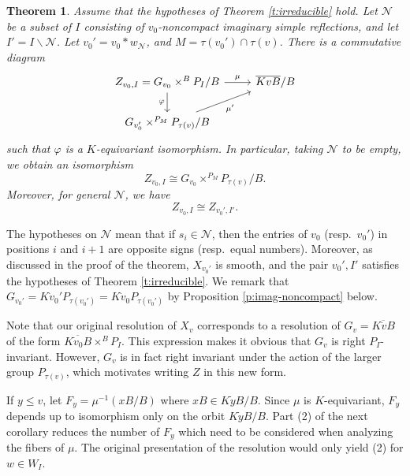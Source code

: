 \documentclass[11pt,letterpaper,reqno]{amsart}
\newcommand{\cN}{\mathcal N}
\numberwithin{equation}{section}
\theoremstyle{plain}
\newtheorem{theorem}{Theorem}[section]
\theoremstyle{definition}
\theoremstyle{remark}
\begin{document}
\begin{theorem}\label{t:symmetric-mu}
Assume that the hypotheses of Theorem \ref{t:irreducible}  hold.
Let $\cN$ be a subset of $I$ consisting of $v_0$-noncompact imaginary simple reflections, and
let $I' = I \smallsetminus \cN$.  
Let $v_0' = v_0 * w_{\cN}$, and \(M= \tau(v_0') \cap\tau(v)\).
There is a commutative diagram
\begin{equation}\label{e:symmetric-mu}
\begin{tikzcd}
Z_{v_0, I} = G_{v_0} \times^B P_I/B\arrow[r,"\mu"]\arrow[d,swap,"\varphi"]&\overline{KvB}/B\\
G_{v_0'} \times^{P_M} P_{\tau(v)}/B\arrow[ur,swap,"\mu'"]
\end{tikzcd}
\end{equation}
such that \(\varphi\) is a \(K\)-equivariant isomorphism.  In particular, taking $\cN$ to be empty,
we obtain an isomorphism
\begin{equation}\label{e:symmetric-mu2}
Z_{v_0, I} \cong G_{v_0} \times^{P_M} P_{\tau(v)}/B.
\end{equation}
Moreover, for general $\cN$, we have
\begin{equation}\label{e:symmetric-mu3}
Z_{v_0, I} \cong Z_{v_0', I'}.
\end{equation}
\end{theorem}



The hypotheses on $\cN$ mean that if $s_i \in \cN$, then the entries of
$v_0$ (resp.~$v_0'$) in positions $i$ and $i+1$ are opposite signs (resp.~equal numbers).
Moreover, as discussed in the proof
of the theorem, $X_{v_0'}$ is smooth, and the pair $v_0', I' $ satisfies the
hypotheses of Theorem \ref{t:irreducible}.
We remark that $G_{v_0'} = K \dot{v}_0' P_{\tau(v_0')} = K \dot{v}_0 P_{\tau(v_0')}$ by 
Proposition \ref{p:imag-noncompact} below.

Note that our original resolution of $X_v$
corresponds to a resolution
of $G_v = \overline{K \dot{v} B}$ of the form $\overline{K \dot{v}_0 B} \times^B P_I$.  This expression makes it obvious that $G_v$
is right $P_I$-invariant.  However, $G_v$ is in fact right invariant under the action of the larger group $P_{\tau(v)}$,
which motivates writing $Z$ in this new form.

If $y \leq v$, let $F_y = \mu^{-1} (x B/B)$
where $xB \in K \dot{y}B/B$.  Since $\mu$ is $K$-equivariant, $F_y$ depends up to isomorphism only on the
orbit $K \dot{y} B/B$.  Part (2) of the next corollary reduces the number of $F_y$ which need to be considered
when analyzing the fibers of $\mu$.  The original presentation of the resolution would only yield (2)
for $w \in W_I$.
\end{document}
